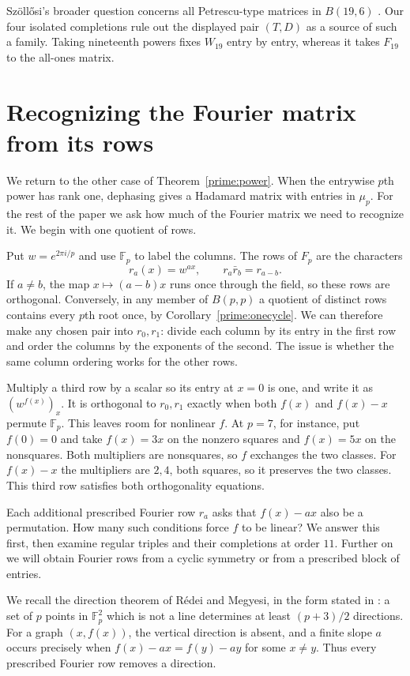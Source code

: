 \documentclass[11pt,a4paper]{article}
\numberwithin{equation}{section}
\begin{document}
Sz\"oll\H{o}si's broader question concerns all Petrescu-type matrices in $B(19,6)$ \cite[Problem~3.2.11]{szthesis}. Our four isolated completions rule out the displayed pair $(T,D)$ as a source of such a family. Taking nineteenth powers fixes $W_{19}$ entry by entry, whereas it takes $F_{19}$ to the all-ones matrix.

\section{Recognizing the Fourier matrix from its rows}\label{sec:rows}

We return to the other case of Theorem~\ref{prime:power}. When the entrywise $p$th power has rank one, dephasing gives a Hadamard matrix with entries in $\mu_p$. For the rest of the paper we ask how much of the Fourier matrix we need to recognize it. We begin with one quotient of rows.

Put $w=e^{2\pi i/p}$ and use $\mathbb F_p$ to label the columns. The rows of $F_p$ are the characters
$$r_a(x)=w^{ax},\qquad r_a\bar r_b=r_{a-b}.$$
If $a\ne b$, the map $x\mapsto(a-b)x$ runs once through the field, so these rows are orthogonal. Conversely, in any member of $B(p,p)$ a quotient of distinct rows contains every $p$th root once, by Corollary~\ref{prime:onecycle}. We can therefore make any chosen pair into $r_0,r_1$: divide each column by its entry in the first row and order the columns by the exponents of the second. The issue is whether the same column ordering works for the other rows.

Multiply a third row by a scalar so its entry at $x=0$ is one, and write it as $(w^{f(x)})_x$. It is orthogonal to $r_0,r_1$ exactly when both $f(x)$ and $f(x)-x$ permute $\mathbb F_p$. This leaves room for nonlinear $f$. At $p=7$, for instance, put $f(0)=0$ and take $f(x)=3x$ on the nonzero squares and $f(x)=5x$ on the nonsquares. Both multipliers are nonsquares, so $f$ exchanges the two classes. For $f(x)-x$ the multipliers are $2,4$, both squares, so it preserves the two classes. This third row satisfies both orthogonality equations.

Each additional prescribed Fourier row $r_a$ asks that $f(x)-ax$ also be a permutation. How many such conditions force $f$ to be linear? We answer this first, then examine regular triples and their completions at order $11$. Further on we will obtain Fourier rows from a cyclic symmetry or from a prescribed block of entries.

We recall the direction theorem of R\'edei and Megyesi, in the form stated in \cite[Theorem~1.1]{somlai}: a set of $p$ points in $\mathbb F_p^2$ which is not a line determines at least $(p+3)/2$ directions. For a graph $(x,f(x))$, the vertical direction is absent, and a finite slope $a$ occurs precisely when $f(x)-ax=f(y)-ay$ for some $x\ne y$. Thus every prescribed Fourier row removes a direction.
\end{document}
